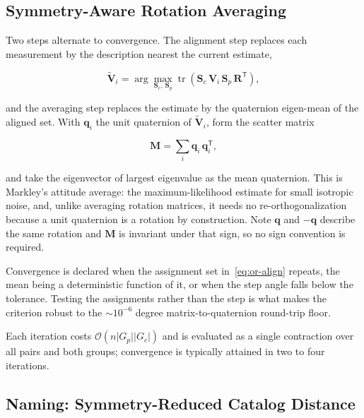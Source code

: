 \subsection{Symmetry-Aware Rotation Averaging}

Two steps alternate to convergence. The alignment step replaces each measurement by the
description nearest the current estimate,

\begin{equation}
\tilde{\mathbf{V}}_{i}
= \arg\max_{\mathbf{S}_{c},\,\mathbf{S}_{p}}
\operatorname{tr}\!\left( \mathbf{S}_{c}\,\mathbf{V}_{i}\,\mathbf{S}_{p}\,
\mathbf{R}^{\mathsf{T}} \right),
\label{eq:or-align}
\end{equation}

and the averaging step replaces the estimate by the quaternion eigen-mean of the aligned set. With
$\mathbf{q}_{i}$ the unit quaternion of $\tilde{\mathbf{V}}_{i}$, form the scatter matrix

\begin{equation}
\mathbf{M} = \sum_{i} \mathbf{q}_{i}\,\mathbf{q}_{i}^{\mathsf{T}},
\label{eq:or-scatter}
\end{equation}

and take the eigenvector of largest eigenvalue as the mean quaternion. This is Markley's
attitude average: the maximum-likelihood estimate for small isotropic noise, and, unlike averaging
rotation matrices, it needs no re-orthogonalization because a unit quaternion is a rotation by
construction. Note $\mathbf{q}$ and $-\mathbf{q}$ describe the same rotation and
$\mathbf{M}$ is invariant under that sign, so no sign convention is required.

Convergence is declared when the assignment set in~\eqref{eq:or-align} repeats, the mean being a
deterministic function of it, or when the step angle falls below the tolerance. Testing the
assignments rather than the step is what makes the criterion robust to the
$\sim 10^{-6}$ degree matrix-to-quaternion round-trip floor.

Each iteration costs $\mathcal{O}\!\left(n \lvert G_{p}\rvert \lvert G_{c}\rvert\right)$ and is
evaluated as a single contraction over all pairs and both groups; convergence is typically
attained in two to four iterations.

\subsection{Naming: Symmetry-Reduced Catalog Distance}

